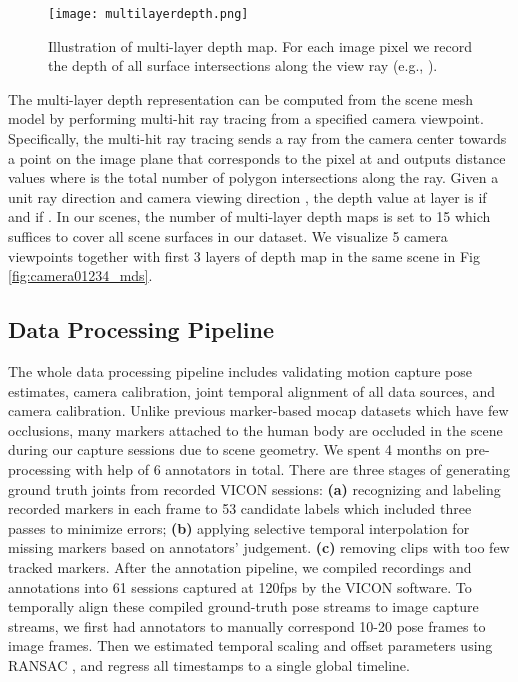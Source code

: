 \documentclass[times,referee,twocolumn,final,authoryear]{elsarticle}
\begin{document}
\begin{figure}
\begin{center}
   \texttt{[image: multilayerdepth.png]}
\end{center}
   \caption{Illustration of multi-layer depth map. For each image pixel we record the 
   depth of all surface intersections along the view ray (e.g.,  ).} 
\label{fig:multilayer}
\end{figure}

The multi-layer depth representation can be computed from the scene mesh model by 
performing multi-hit ray tracing from a specified camera viewpoint. Specifically, the 
multi-hit ray tracing sends a ray from the camera center towards a point on the 
image plane that corresponds to the pixel at  and outputs distance
values  where  is the total number of
polygon intersections along the ray.  Given a unit ray direction  and
camera viewing direction , the depth value at layer  is  if  and  if . In our scenes, the number of multi-layer depth maps is set to 15 which suffices
to cover all scene surfaces in our dataset. We visualize 5 camera viewpoints together 
with first 3 layers of depth map in the same scene in Fig \ref{fig:camera01234_mds}.

\subsection{Data Processing Pipeline}
The whole data processing pipeline includes validating motion capture pose
estimates, camera calibration, joint temporal alignment of all data  sources,
and camera calibration.
Unlike previous marker-based mocap datasets which have few occlusions, many markers
attached to the human body are occluded in the scene during our capture
sessions due to scene geometry. We spent 4 months on pre-processing with help of 6 
annotators in total.  There are three stages of generating ground truth joints from 
recorded VICON sessions: \textbf{(a)} recognizing and labeling recorded markers in each
frame to 53 candidate labels which included three passes to minimize errors;
\textbf{(b)} applying selective temporal interpolation for missing markers
based on annotators' judgement. \textbf{(c)} removing clips with too few
tracked markers. After the annotation pipeline, we compiled recordings and
annotations into 61 sessions captured at 120fps by the VICON software. To
temporally align these compiled ground-truth pose streams to image capture
streams, we first had annotators to manually correspond 10-20 pose
frames to image frames. Then we estimated temporal scaling and offset 
parameters using RANSAC \cite{fischler1981random}, and regress all timestamps 
to a single global timeline. 
\end{document}
